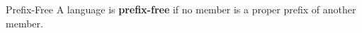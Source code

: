 \documentclass[letterpaper]{article}
\begin{document}
\begin{definition}{Prefix-Free}{}
    A language is \textbf{prefix-free} if no member is a proper prefix of another member.
\end{definition}









































\newpage 
\end{document}
